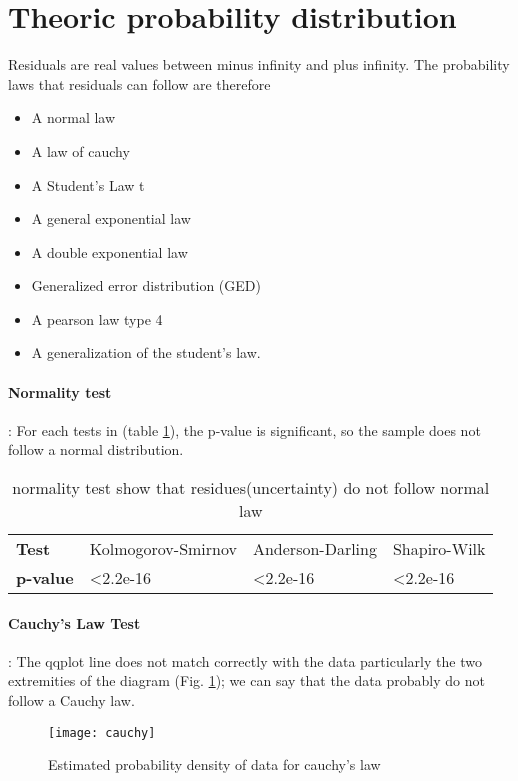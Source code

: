 \section{Theoric probability distribution}

Residuals are real values between minus infinity and plus infinity. The probability laws that residuals can follow are therefore

\begin{itemize}
\item A normal law
\item A law of cauchy
\item A Student's Law t
\item A general exponential law
\item A double exponential law
\item Generalized error distribution (GED)
\item A pearson law type 4
\item A generalization of the student's law.
\end{itemize}


\paragraph{Normality test}:
For each tests in (table \ref{normal}), the p-value is significant, so the sample does not follow a normal distribution.

\begin{table}[h]
\centering
\caption{normality test show that residues(uncertainty) do not follow normal law}
\label{normal}
\begin{tabular}{llll}
\textbf{Test}    & Kolmogorov-Smirnov & Anderson-Darling  & Shapiro-Wilk      \\
\textbf{p-value} & \textless 2.2e-16  & \textless 2.2e-16 & \textless 2.2e-16
\end{tabular}
\end{table}

\paragraph{Cauchy's Law Test}: The qqplot line does not match correctly with the data particularly the two extremities of the diagram (Fig. \ref{cauchy}); we can say that the data probably do not follow a Cauchy law.

\begin{figure}[h]
\centering
\texttt{[image: cauchy]}
\caption{Estimated probability density of data for cauchy's law}
\label{cauchy}
\end{figure}

